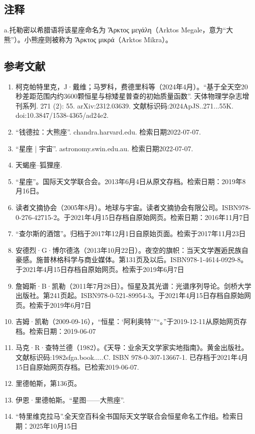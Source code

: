 \subsection{注释}

a.托勒密以希腊语将该星座命名为 Ἄρκτος μεγάλη（Arktos Megale，意为“大熊”）。小熊座则被称为 Ἄρκτος μικρά（Arktos Mikra）。\\
\subsection{参考文献}
\begin{enumerate}
\item 柯克帕特里克，J·戴维；马罗科，费德里科等（2024年4月）。“基于全天空20秒差距范围内约3600颗恒星与棕矮星普查的初始质量函数”. 天体物理学杂志增刊系列. 271 (2): 55. arXiv:2312.03639. 文献标识码:2024ApJS..271...55K. doi:10.3847/1538-4365/ad24e2.
\item “钱德拉：大熊座”. chandra.harvard.edu. 检索日期2022-07-07.
\item “星座 | 宇宙”. astronomy.swin.edu.au. 检索日期2022-07-07.
\item 天蝎座–狐狸座.
\item “星座”。国际天文学联合会。2013年6月4日从原文存档。检索日期：2019年8月16日。
\item 读者文摘协会（2005年8月）。地球与宇宙。读者文摘协会有限公司。ISBN978-0-276-42715-2。于2021年4月15日存档自原始网页。检索日期：2016年11月7日
\item “查尔斯的酒馆”。归档于2017年12月1日自原始页面。检索于2017年11月23日
\item 安德烈·G·博尔德洛（2013年10月22日）。夜空的旗帜：当天文学邂逅民族自豪感。施普林格科学与商业媒体。第131页及以后。ISBN978-1-4614-0929-8。于2021年4月15日存档自原始网页。检索于2019年6月7日
\item 詹姆斯·B·凯勒（2011年7月28日）。恒星及其光谱：光谱序列导论。剑桥大学出版社。第241页起。ISBN978-0-521-89954-3。于2021年4月15日存档自原始网页。检索于2019年6月7日
\item 吉姆·凯勒（2009-09-16），“恒星：‘阿利奥特’”“。”于2019-12-11从原始网页存档。检索日期：2019-06-07
\item 马克·R·查特兰德（1982）。《天导：业余天文学家实地指南》。黄金出版社。文献标识码:1982sfga.book.....C. ISBN 978-0-307-13667-1. 已存档于2021年4月15日自原始网页存档。已检索2019-06-07.
\item 里德帕斯，第136页。
\item 伊恩·里德帕斯。“星图——大熊座”.
\item “特里维克拉马”.全天空百科全书国际天文学联合会恒星命名工作组。检索日期：2025年10月15日

\end{enumerate}
